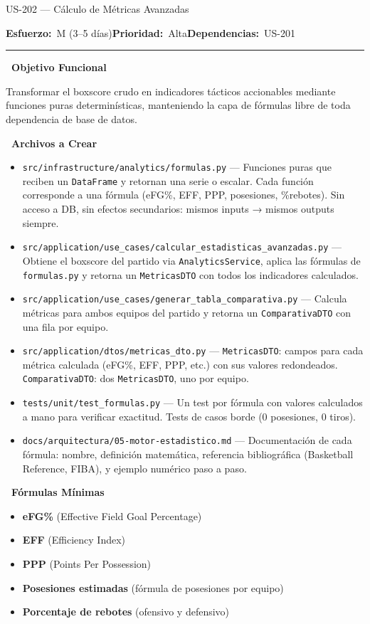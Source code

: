 \documentclass[11pt,a4paper]{article}
\newcommand{\fpath}[1]{\texttt{\small #1}}
\newcommand{\usfield}[2][\;]{%
  \par\vspace{5pt}%
  {\small\textbf{\textcolor{primary}{#2}}}\par\vspace{2pt}%
}
\newcommand{\usmeta}[3]{%
  \vspace{2pt}%
  {\small\textcolor{secondary}{%
    \textbf{Esfuerzo:}~#1\quad\textbf{Prioridad:}~#2\quad\textbf{Dependencias:}~#3%
  }}%
  \par\vspace{4pt}%
  \textcolor{bordergray}{\rule{\linewidth}{0.4pt}}\par\vspace{4pt}%
}
\begin{document}
\begin{uscard}{US-202 — Cálculo de Métricas Avanzadas}

\usmeta{M (3–5 días)}{Alta}{US-201}

\usfield{\faAlignLeft\ Objetivo Funcional}
Transformar el boxscore crudo en indicadores tácticos accionables mediante funciones puras determinísticas, manteniendo la capa de fórmulas libre de toda dependencia de base de datos.

\usfield{\faFolderOpen\ Archivos a Crear}
\begin{itemize}[nosep, leftmargin=1.6em]
  \item \fpath{src/infrastructure/analytics/formulas.py} — Funciones puras que reciben un \fpath{DataFrame} y retornan una serie o escalar. Cada función corresponde a una fórmula (eFG\%, EFF, PPP, posesiones, \%rebotes). Sin acceso a DB, sin efectos secundarios: mismos inputs → mismos outputs siempre.
  \item \fpath{src/application/use\_cases/calcular\_estadisticas\_avanzadas.py} — Obtiene el boxscore del partido via \fpath{AnalyticsService}, aplica las fórmulas de \fpath{formulas.py} y retorna un \fpath{MetricasDTO} con todos los indicadores calculados.
  \item \fpath{src/application/use\_cases/generar\_tabla\_comparativa.py} — Calcula métricas para ambos equipos del partido y retorna un \fpath{ComparativaDTO} con una fila por equipo.
  \item \fpath{src/application/dtos/metricas\_dto.py} — \fpath{MetricasDTO}: campos para cada métrica calculada (eFG\%, EFF, PPP, etc.) con sus valores redondeados. \fpath{ComparativaDTO}: dos \fpath{MetricasDTO}, uno por equipo.
  \item \fpath{tests/unit/test\_formulas.py} — Un test por fórmula con valores calculados a mano para verificar exactitud. Tests de casos borde (0 posesiones, 0 tiros).
  \item \fpath{docs/arquitectura/05-motor-estadistico.md} — Documentación de cada fórmula: nombre, definición matemática, referencia bibliográfica (Basketball Reference, FIBA), y ejemplo numérico paso a paso.
\end{itemize}

\usfield{\faChartBar\ Fórmulas Mínimas}
\begin{itemize}[nosep, leftmargin=1.6em]
  \item \textbf{eFG\%} (Effective Field Goal Percentage)
  \item \textbf{EFF} (Efficiency Index)
  \item \textbf{PPP} (Points Per Possession)
  \item \textbf{Posesiones estimadas} (fórmula de posesiones por equipo)
  \item \textbf{Porcentaje de rebotes} (ofensivo y defensivo)
\end{itemize}


\end{uscard}
\end{document}
